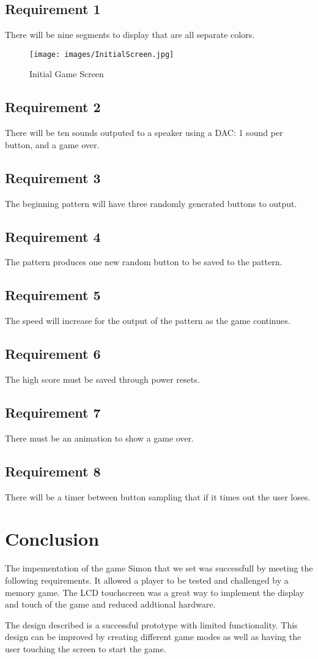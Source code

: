 \documentclass[draft]{article}
\begin{document}
\subsection{Requirement 1}
There will be nine segments to display that are all separate colors.
\begin{figure}[h]
\texttt{[image: images/InitialScreen.jpg]}
\caption{Initial Game Screen}
\label{Figure1}
\end{figure}
\subsection{Requirement 2}
There will be ten sounds outputed to a speaker using a DAC: 1 sound per button, and a game over.
\subsection{Requirement 3}
The beginning pattern will have three randomly generated buttons to output.
\subsection{Requirement 4}
The pattern produces one new random button to be saved to the pattern.
\subsection{Requirement 5}
The speed will increase for the output of the pattern as the game continues.
\subsection{Requirement 6}
The high score must be saved through power resets.
\subsection{Requirement 7}
There must be an animation to show a game over.
\subsection{Requirement 8}
There will be a timer between button sampling that if it times out the user loses.

\section{Conclusion}
The impementation of the game Simon that we set was successfull by meeting the following requirements.  It allowed a player to be tested and challenged by a memory game.  The LCD touchscreen was a great way to implement the display and touch of the game and reduced addtional hardware.  
\par\noindent
The	design	described	is	a	successful	prototype	with	limited	functionality.	This	design	can	
be	improved	by creating different game modes as well as having the user touching the screen to start the game.	
\end{document}
